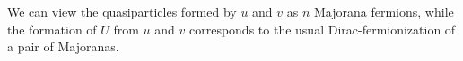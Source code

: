 \documentclass[reprint,amsmath,amssymb,aps,prb,groupedaddress,nofootinbib,superscriptaddress]{revtex4-1}
\newcommand{\1}{\mathds{1}}
\begin{document}
We can view the quasiparticles formed by $u$ and $v$ as $n$ Majorana fermions, while the formation of $U$ from $u$ and $v$ corresponds to the usual Dirac-fermionization of a pair of Majoranas.
\end{document}

